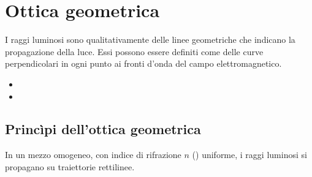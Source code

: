 \documentclass[letterpaper,10pt,italian]{jupyterBook}
\begin{document}
\section{Ottica geometrica}
\label{\detokenize{ch/waves/optics-geometric:ottica-geometrica}}\label{\detokenize{ch/waves/optics-geometric:physics-hs-waves-optics-geometric}}\label{\detokenize{ch/waves/optics-geometric::doc}}
\sphinxAtStartPar
{} I raggi luminosi sono qualitativamente delle linee geometriche che indicano la propagazione della luce. Essi possono essere definiti come delle curve perpendicolari in ogni punto ai fronti d’onda del campo elettromagnetico.

\sphinxAtStartPar
{}
\begin{itemize}
\item {} 
\sphinxAtStartPar
{}

\item {} 
\sphinxAtStartPar
{}

\end{itemize}


\subsection{Princìpi dell’ottica geometrica}
\label{\detokenize{ch/waves/optics-geometric:principi-dell-ottica-geometrica}}\label{\detokenize{ch/waves/optics-geometric:physics-hs-waves-optics-geometric-principles}}
\sphinxAtStartPar
{} In un mezzo omogeneo, con indice di rifrazione \(n\) () uniforme, i raggi luminosi si propagano su traiettorie rettilinee.
\end{document}
